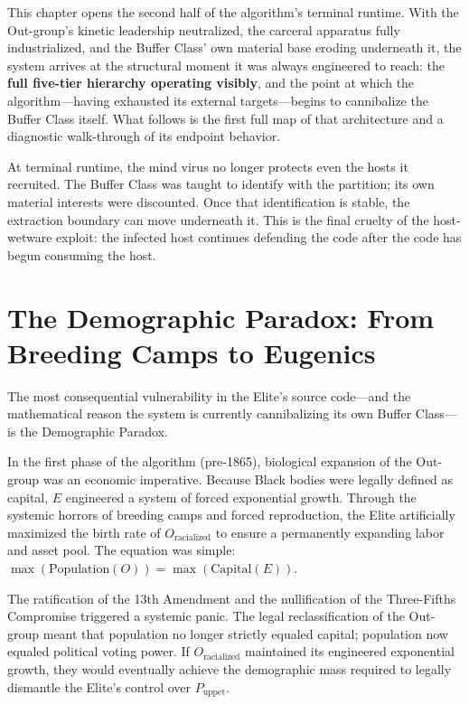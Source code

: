 This chapter opens the second half of the algorithm's terminal runtime. With the Out-group's kinetic leadership neutralized, the carceral apparatus fully industrialized, and the Buffer Class' own material base eroding underneath it, the system arrives at the structural moment it was always engineered to reach: the \textbf{full five-tier hierarchy operating visibly}, and the point at which the algorithm---having exhausted its external targets---begins to cannibalize the Buffer Class itself. What follows is the first full map of that architecture and a diagnostic walk-through of its endpoint behavior.

At terminal runtime, the mind virus no longer protects even the hosts it recruited. The Buffer Class was taught to identify with the partition; its own material interests were discounted. Once that identification is stable, the extraction boundary can move underneath it. This is the final cruelty of the host-wetware exploit: the infected host continues defending the code after the code has begun consuming the host.

\section{The Demographic Paradox: From Breeding Camps to Eugenics}

The most consequential vulnerability in the Elite's source code---and the mathematical reason the system is currently cannibalizing its own Buffer Class---is the Demographic Paradox.

In the first phase of the algorithm (pre-1865), biological expansion of the Out-group was an economic imperative. Because Black bodies were legally defined as capital, $E$ engineered a system of forced exponential growth. Through the systemic horrors of breeding camps and forced reproduction, the Elite artificially maximized the birth rate of $O_{\text{racialized}}$ to ensure a permanently expanding labor and asset pool. The equation was simple: $\max(\text{Population}(O)) = \max(\text{Capital}(E))$.

The ratification of the 13th Amendment and the nullification of the Three-Fifths Compromise triggered a systemic panic. The legal reclassification of the Out-group meant that population no longer strictly equaled capital; population now equaled political voting power. If $O_{\text{racialized}}$ maintained its engineered exponential growth, they would eventually achieve the demographic mass required to legally dismantle the Elite's control over $P_{\text{uppet}}$.

